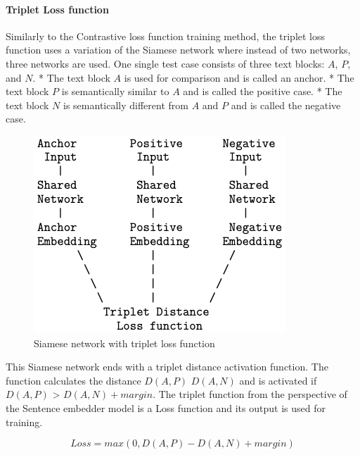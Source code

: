 \documentclass{wseas}
\begin{document}
\paragraph{Triplet Loss function}

Similarly to the Contrastive loss function training method, the triplet
loss function uses a variation of the Siamese network where instead of
two networks, three networks are used. One single test case consists of
three text blocks: \(A\), \(P\), and \(N\). * The text block \(A\) is
used for comparison and is called an anchor. * The text block \(P\) is
semantically similar to \(A\) and is called the positive case. * The
text block \(N\) is semantically different from \(A\) and \(P\) and is
called the negative case.


\begin{figure}[htbp]
  \centering
  \includegraphics[width=\linewidth]{resources/v1/tripletLoss.png}
  \caption{Siamese network with triplet loss function}
  \label{fig:triplet_loss_function_figure}
\end{figure}

This Siamese network ends with a triplet distance activation function.
The function calculates the distance \(D(A,P)\) \(D(A,N)\) and is
activated if \(D(A,P)\) \textgreater{} \(D(A,N) + margin\). The
triplet function from the perspective of the Sentence embedder model is
a Loss function and its output is used for training. 

\begin{equation}
  Loss = max(0, D(A,P) - D(A,N) + margin) 
\end{equation}\cite{cite5}
\end{document}
